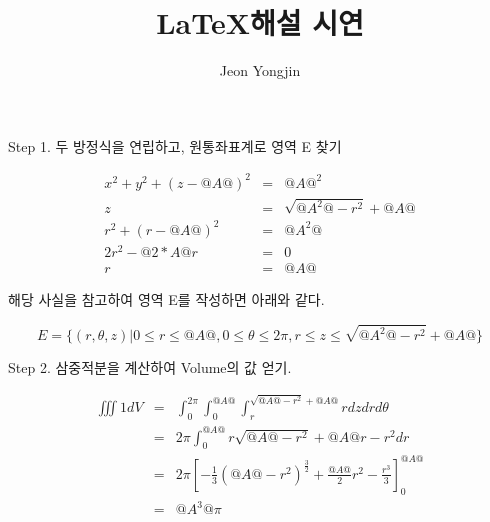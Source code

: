 \documentclass{article}
\author{Jeon Yongjin}
\title{\LaTeX 해설 시연}
\date{}
\begin{document}
\maketitle

Step 1. 두 방정식을 연립하고, 원통좌표계로 영역 E 찾기

\begin{eqnarray*} x^2 + y^2 + (z-{@A@})^2 &=& {@A@}^2 \\ z &=& \sqrt{{@A^2@} - r^2} + {@A@} \\ r^2 + (r-{@A@})^2 &=& {@A^2@} \\ 2r^2 - {@2*A@}r &=& 0 \\ r &=& {@A@} \end{eqnarray*}

해당 사실을 참고하여 영역 E를 작성하면 아래와 같다.

\[E  = \{ (r,\theta,z) | 0 \leq r \leq {@A@}, 0 \leq \theta \leq 2\pi, r \leq z \leq \sqrt{{@A^2@}-r^2}+{@A@} \}\]

Step 2. 삼중적분을 계산하여 Volume의 값 얻기.

\begin{eqnarray*} \iiint 1 dV &=& \int_{0}^{2\pi} \int_{0}^{{@A@}} \int_{r}^{\sqrt{{@A@}-r^2}+{@A@}} r dz dr d\theta \\ &=& 2\pi \int_{0}^{{@A@}} r\sqrt{{@A@}-r^2} + {@A@}r -r^2 dr \\ &=& 2\pi \left[ -\frac{1}{3}({@A@}-r^2)^{\frac{3}{2}} + \frac{{@A@}}{2}r^2 - \frac{r^3}{3} \right]_{0}^{{@A@}} \\ &=& {@A^3@}\pi \end{eqnarray*}
\end{document}
